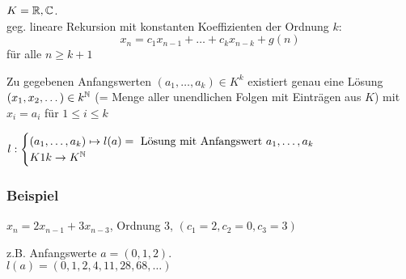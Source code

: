 $K = \operatorname{\mathbb{R}}, \operatorname{\mathbb{C}}$.
\\ geg. lineare Rekursion mit konstanten Koeffizienten der Ordnung $k$:
\[x_n = c_1x_{n-1} + \dots + c_kx_{n-k} + g(n)\] für alle $n \geq k +1$

Zu gegebenen Anfangswerten $(a_1, \dots, a_k) \in K^k$  existiert genau eine Lösung $(x_1, x_2, \dots) \in k^{\operatorname{\mathbb{N}}}$ (= Menge aller unendlichen Folgen mit Einträgen aus $K$) mit $x_i = a_i$ für $1 \leq i \leq k$

$l : \begin{cases}
(a_1, \dots, a_k) \mapsto l(a) = \text{ Lösung mit Anfangswert } a_1, \dots, a_k \\ K1 k \to K^{\operatorname{\mathbb{N}}}
\end{cases}$

\subsubsection*{Beispiel}

$x_n = 2x_{n-1} + 3x_{n-3}$, Ordnung 3, $(c_1 = 2, c_2 = 0, c_3 = 3)$

z.B. Anfangswerte $a=(0, 1, 2)$.
\\ $l(a) = (0, 1, 2, 4, 11, 28, 68, \dots)$

